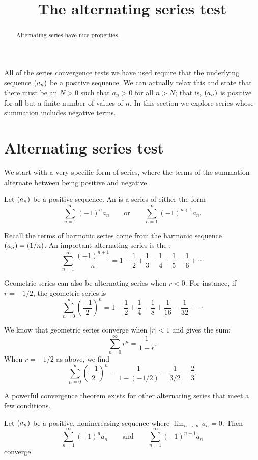 \documentclass{ximera}
\title[Dig-In:]{The alternating series test}
\begin{document}
\begin{abstract}
  Alternating series have nice properties.
\end{abstract}
\maketitle

All of the series convergence tests we have used require that the
underlying sequence $\left( a_n \right)$ be a positive sequence. We can
actually relax this and state that there must be an $N>0$ such that
$a_n>0$ for all $n>N$; that is, $\left( a_n \right)$ is positive for all but a
finite number of values of $n$. In this section we explore series
whose summation includes negative terms.


\section{Alternating series test}

We start with a very specific form of series, where the terms of the
summation alternate between being positive and negative.

\begin{definition}
Let $\left( a_n \right)$ be a positive sequence. An  is
a series of either the form 
\[
\sum_{n=1}^\infty (-1)^na_n\qquad \text{or}\qquad \sum_{n=1}^\infty (-1)^{n+1}a_n.
\]
\end{definition}

Recall the terms of harmonic series come from the harmonic sequence
$\left( a_n \right) = \left( 1/n \right)$. An important alternating series is the
:
\[
\sum_{n=1}^\infty \frac{(-1)^{n+1}}{n} = 1-\frac12+\frac13-\frac14+\frac15-\frac16+\cdots
\]

Geometric series can also be alternating series when $r<0$. For
instance, if $r=-1/2$, the geometric series is
\[
\sum_{n=0}^\infty \left(\frac{-1}{2}\right)^n = 1-\frac12+\frac14-\frac18+\frac1{16}-\frac1{32}+\cdots
\]

We know that geometric series converge when $|r|<1$ and gives the sum:
\[
\sum_{n=0}^\infty r^n = \frac1{1-r}.
\]
When $r=-1/2$ as above, we find
\[
\sum_{n=0}^\infty \left(\frac{-1}{2}\right)^n = \frac1{1-(-1/2)} = \frac 1{3/2} = \frac23.
\]

A powerful convergence theorem exists for other alternating series
that meet a few conditions.

\begin{theorem}
Let $\left( a_n \right)$ be a positive, nonincreasing sequence where
$\lim_{n\to\infty}a_n=0$. Then
\[
\sum_{n=1}^\infty (-1)^{n}a_n \qquad \text{and}\qquad \sum_{n=1}^\infty (-1)^{n+1}a_n 
\]
converge.
\end{theorem}
\end{document}
